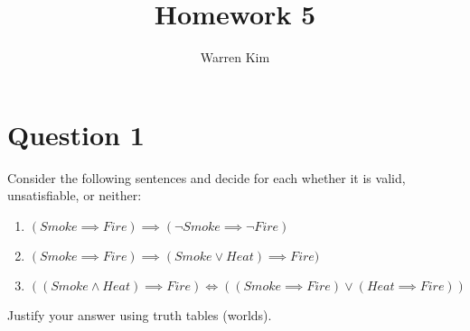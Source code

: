 \documentclass[13pt]{article}
\title{Homework 5}
\author{Warren Kim}
\begin{document}
\maketitle

\newpage
\section*{Question 1} Consider the following sentences and decide for
each whether it is valid, unsatisfiable, or neither:
\begin{enumerate}[label=(\alph*)]
\item $(Smoke \implies Fire) \implies (\neg Smoke \implies \neg Fire)$
\item $(Smoke \implies Fire) \implies (Smoke \lor Heat) \implies
  Fire)$
\item $((Smoke \land Heat) \implies Fire) \iff ((Smoke \implies Fire)
  \lor (Heat \implies Fire))$
\end{enumerate} Justify your answer using truth tables (worlds).
\end{document}
